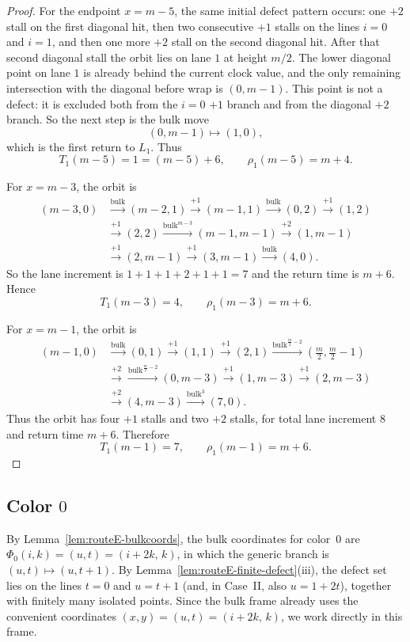 \documentclass[11pt]{article}
\newcommand{\bulk}{\mathrm{bulk}}   %
\begin{document}
\begin{proof}
For the endpoint $x=m-5$, the same initial defect pattern occurs: one $+2$ stall on the first diagonal hit,
then two consecutive $+1$ stalls on the lines $i=0$ and $i=1$, and then one more $+2$ stall on the second
diagonal hit.
After that second diagonal stall the orbit lies on lane $1$ at height $m/2$.
The lower diagonal point on lane $1$ is already behind the current clock value, and the only remaining
intersection with the diagonal before wrap is $(0,m-1)$.
This point is not a defect: it is excluded both from the $i=0$ $+1$ branch and from the diagonal $+2$
branch.
So the next step is the bulk move
\[
(0,m-1)\mapsto(1,0),
\]
which is the first return to $L_1$.
Thus
\[
T_1(m-5)=1=(m-5)+6,\qquad \rho_1(m-5)=m+4.
\]

For $x=m-3$, the orbit is
\[
\begin{aligned}
(m-3,0)&\xrightarrow{\bulk}(m-2,1)\xrightarrow{+1}(m-1,1)\xrightarrow{\bulk}(0,2)\xrightarrow{+1}(1,2)\\
&\xrightarrow{+1}(2,2)\xrightarrow{\bulk^{m-3}}(m-1,m-1)\xrightarrow{+2}(1,m-1)\\
&\xrightarrow{+1}(2,m-1)\xrightarrow{+1}(3,m-1)\xrightarrow{\bulk}(4,0).
\end{aligned}
\]
So the lane increment is $1+1+1+2+1+1=7$ and the return time is $m+6$.
Hence
\[
T_1(m-3)=4,\qquad \rho_1(m-3)=m+6.
\]

For $x=m-1$, the orbit is
\[
\begin{aligned}
(m-1,0)&\xrightarrow{\bulk}(0,1)\xrightarrow{+1}(1,1)\xrightarrow{+1}(2,1)
\xrightarrow{\bulk^{\frac m2-2}}\left(\frac m2,\frac m2-1\right)\\
&\xrightarrow{+2}\xrightarrow{\bulk^{\frac m2-2}}(0,m-3)\xrightarrow{+1}(1,m-3)
\xrightarrow{+1}(2,m-3)\\
&\xrightarrow{+2}(4,m-3)\xrightarrow{\bulk^3}(7,0).
\end{aligned}
\]
Thus the orbit has four $+1$ stalls and two $+2$ stalls, for total lane increment $8$ and return time
$m+6$.
Therefore
\[
T_1(m-1)=7,\qquad \rho_1(m-1)=m+6.
\]
\end{proof}

\subsection{Color $0$}

By Lemma~\ref{lem:routeE-bulkcoords}, the bulk coordinates for color~$0$ are $\Phi_0(i,k)=(u,t)=(i+2k,\,k)$, in which the generic branch is $(u,t)\mapsto(u,t+1)$.
By Lemma~\ref{lem:routeE-finite-defect}\textup{(iii)}, the defect set lies on the lines $t=0$ and $u=t+1$ (and, in Case~II, also $u=1+2t$), together with finitely many isolated points.
Since the bulk frame already uses the convenient coordinates $(x,y)=(u,t)=(i+2k,\,k)$, we work directly in this frame.
\end{document}
